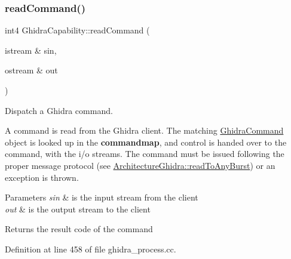 \subsubsection{\texorpdfstring{readCommand()}{readCommand()}}
{\footnotesize\ttfamily int4 Ghidra\+Capability\+::read\+Command (\begin{DoxyParamCaption}\item[{istream \&}]{sin,  }\item[{ostream \&}]{out }\end{DoxyParamCaption})\hspace{0.3cm}{\ttfamily [static]}}



Dispatch a Ghidra command. 

A command is read from the Ghidra client. The matching \mbox{\hyperlink{class_ghidra_command}{Ghidra\+Command}} object is looked up in the {\bfseries{commandmap}}, and control is handed over to the command, with the i/o streams. The command must be issued following the proper message protocol (see \mbox{\hyperlink{class_architecture_ghidra_a3132c5fe1bb675952197aa4eafcf298e}{Architecture\+Ghidra\+::read\+To\+Any\+Burst}}) or an exception is thrown. 
\begin{DoxyParams}{Parameters}
{\em sin} & is the input stream from the client \\
\hline
{\em out} & is the output stream to the client \\
\hline
\end{DoxyParams}
\begin{DoxyReturn}{Returns}
the result code of the command 
\end{DoxyReturn}


Definition at line 458 of file ghidra\+\_\+process.\+cc.

